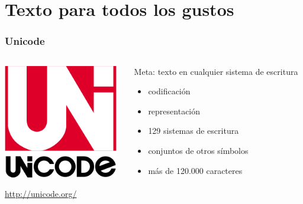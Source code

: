 %
%

\section{Texto para todos los gustos}

\begin{frame}
\frametitle{Unicode}

\begin{columns}[T]
\begin{column}{.48\textwidth}
\includegraphics[width=5cm]{figs/unicode-logo}

\vspace{.5cm}

{\Large

\begin{flushright}
\url{http://unicode.org/}
\end{flushright}
}

\end{column}%
\hfill%
\begin{column}{.60\textwidth}
  {\Large
    Meta: texto en cualquier sistema de escritura
    
    \begin{itemize}
    \item codificación
    \item representación
    \end{itemize}

    \vspace{.2cm}
    
    \begin{itemize}
    \item 129 sistemas de escritura
    \item conjuntos de otros símbolos
    \item más de 120.000 caracteres
    \end{itemize}
  }
\end{column}%
\end{columns}

\end{frame}

